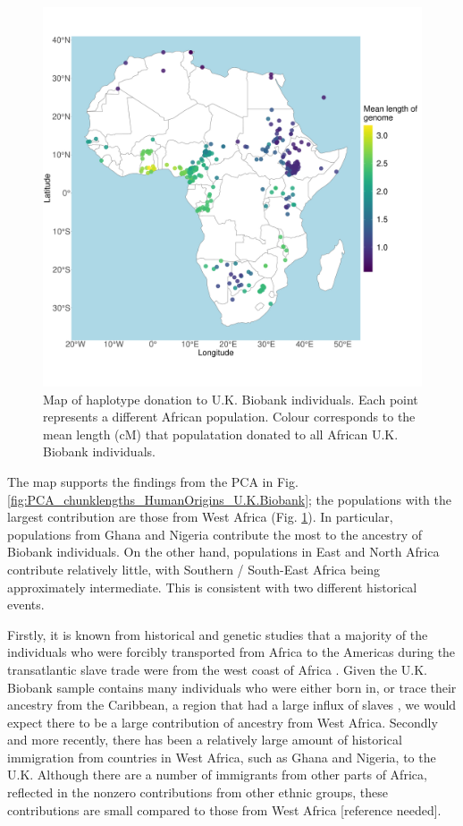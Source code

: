 \begin{figure}[htp]
    \centering
    \includegraphics[width=1.0\textwidth]{../images/chapter3/haplotype_sharing_map.pdf}
    \caption{Map of haplotype donation to U.K. Biobank individuals. Each point represents a different African population. Colour corresponds to the mean length (cM) that populatation donated to all African U.K. Biobank individuals.}
    \label{fig:haplotype_sharing_map_zoomed_II}
\end{figure}

The map supports the findings from the PCA in Fig. \ref{fig:PCA_chunklengths_HumanOrigins_U.K.Biobank}; the populations with the largest contribution are those from West Africa (Fig. \ref{fig:haplotype_sharing_map_zoomed_II}). In particular, populations from Ghana and Nigeria contribute the most to the ancestry of Biobank individuals. On the other hand, populations in East and North Africa contribute relatively little, with Southern / South-East Africa being approximately intermediate. This is consistent with two different historical events. 

Firstly, it is known from historical and genetic studies that a majority of the individuals who were forcibly transported from Africa to the Americas during the transatlantic slave trade were from the west coast of Africa \cite{micheletti2020genetic}. Given the U.K. Biobank sample contains many individuals who were either born in, or trace their ancestry from the Caribbean, a region that had a large influx of slaves \cite{rawley2005transatlantic}, we would expect there to be a large contribution of ancestry from West Africa. Secondly and more recently, there has been a relatively large amount of historical immigration from countries in West Africa, such as Ghana and Nigeria, to the U.K. Although there are a number of immigrants from other parts of Africa, reflected in the nonzero contributions from other ethnic groups, these contributions are small compared to those from West Africa [reference needed].

